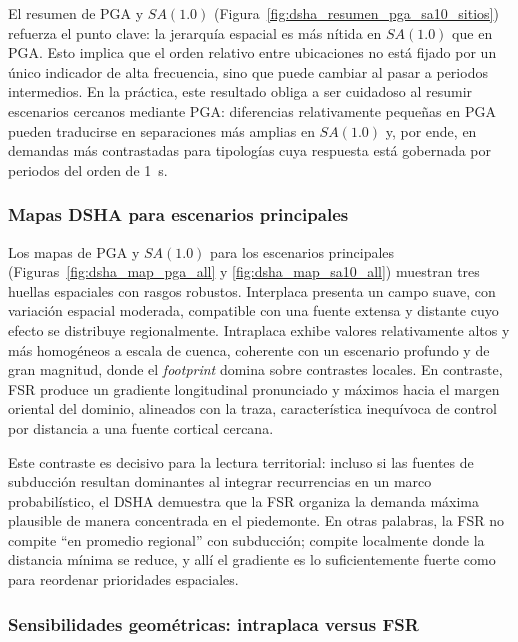 El resumen de PGA y $SA(1.0)$ (Figura~\ref{fig:dsha_resumen_pga_sa10_sitios}) refuerza el punto clave: la jerarquía espacial es más nítida en $SA(1.0)$ que en PGA. Esto implica que el orden relativo entre ubicaciones no está fijado por un único indicador de alta frecuencia, sino que puede cambiar al pasar a periodos intermedios. En la práctica, este resultado obliga a ser cuidadoso al resumir escenarios cercanos mediante PGA: diferencias relativamente pequeñas en PGA pueden traducirse en separaciones más amplias en $SA(1.0)$ y, por ende, en demandas más contrastadas para tipologías cuya respuesta está gobernada por periodos del orden de 1~s.

\subsubsection{Mapas DSHA para escenarios principales}
\label{subsubsec:disc_dsha_mapas_principales}

Los mapas \pFifty{} de PGA y $SA(1.0)$ para los escenarios principales (Figuras~\ref{fig:dsha_map_pga_all} y \ref{fig:dsha_map_sa10_all}) muestran tres huellas espaciales con rasgos robustos. Interplaca presenta un campo suave, con variación espacial moderada, compatible con una fuente extensa y distante cuyo efecto se distribuye regionalmente. Intraplaca exhibe valores relativamente altos y más homogéneos a escala de cuenca, coherente con un escenario profundo y de gran magnitud, donde el \textit{footprint} domina sobre contrastes locales. En contraste, FSR produce un gradiente longitudinal pronunciado y máximos hacia el margen oriental del dominio, alineados con la traza, característica inequívoca de control por distancia a una fuente cortical cercana.

Este contraste es decisivo para la lectura territorial: incluso si las fuentes de subducción resultan dominantes al integrar recurrencias en un marco probabilístico, el DSHA demuestra que la FSR organiza la demanda máxima plausible de manera concentrada en el piedemonte. En otras palabras, la FSR no compite ``en promedio regional'' con subducción; compite localmente donde la distancia mínima se reduce, y allí el gradiente es lo suficientemente fuerte como para reordenar prioridades espaciales.

\subsubsection{Sensibilidades geométricas: intraplaca versus FSR}
\label{subsubsec:disc_dsha_sensibilidades}

